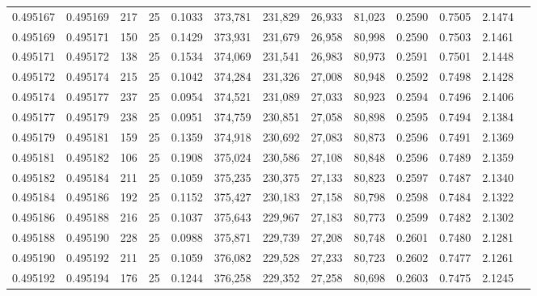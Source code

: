 \begin{tabular}{rrrrrrrrrrrrr}
0.495167 & 0.495169 &   217 &  25 &                                     0.1033 & 373,781 & 231,829 &  26,933 &  81,023 & 0.2590 & 0.7505 & 2.1474 \\
0.495169 & 0.495171 &   150 &  25 &                                     0.1429 & 373,931 & 231,679 &  26,958 &  80,998 & 0.2590 & 0.7503 & 2.1461 \\
0.495171 & 0.495172 &   138 &  25 &                                     0.1534 & 374,069 & 231,541 &  26,983 &  80,973 & 0.2591 & 0.7501 & 2.1448 \\
0.495172 & 0.495174 &   215 &  25 &                                     0.1042 & 374,284 & 231,326 &  27,008 &  80,948 & 0.2592 & 0.7498 & 2.1428 \\
0.495174 & 0.495177 &   237 &  25 &                                     0.0954 & 374,521 & 231,089 &  27,033 &  80,923 & 0.2594 & 0.7496 & 2.1406 \\
0.495177 & 0.495179 &   238 &  25 &                                     0.0951 & 374,759 & 230,851 &  27,058 &  80,898 & 0.2595 & 0.7494 & 2.1384 \\
0.495179 & 0.495181 &   159 &  25 &                                     0.1359 & 374,918 & 230,692 &  27,083 &  80,873 & 0.2596 & 0.7491 & 2.1369 \\
0.495181 & 0.495182 &   106 &  25 &                                     0.1908 & 375,024 & 230,586 &  27,108 &  80,848 & 0.2596 & 0.7489 & 2.1359 \\
0.495182 & 0.495184 &   211 &  25 &                                     0.1059 & 375,235 & 230,375 &  27,133 &  80,823 & 0.2597 & 0.7487 & 2.1340 \\
0.495184 & 0.495186 &   192 &  25 &                                     0.1152 & 375,427 & 230,183 &  27,158 &  80,798 & 0.2598 & 0.7484 & 2.1322 \\
0.495186 & 0.495188 &   216 &  25 &                                     0.1037 & 375,643 & 229,967 &  27,183 &  80,773 & 0.2599 & 0.7482 & 2.1302 \\
0.495188 & 0.495190 &   228 &  25 &                                     0.0988 & 375,871 & 229,739 &  27,208 &  80,748 & 0.2601 & 0.7480 & 2.1281 \\
0.495190 & 0.495192 &   211 &  25 &                                     0.1059 & 376,082 & 229,528 &  27,233 &  80,723 & 0.2602 & 0.7477 & 2.1261 \\
0.495192 & 0.495194 &   176 &  25 &                                     0.1244 & 376,258 & 229,352 &  27,258 &  80,698 & 0.2603 & 0.7475 & 2.1245 \\

\end{tabular}
